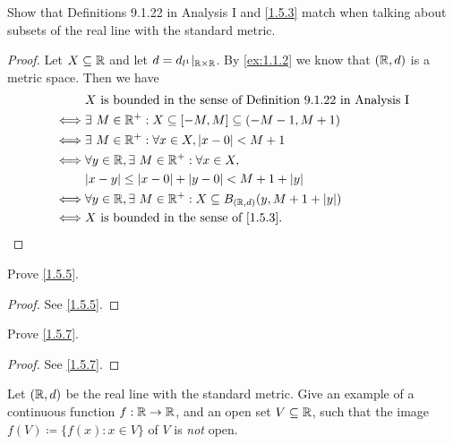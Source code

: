 \begin{ex}\label{ex:1.5.1}
  Show that Definitions 9.1.22 in Analysis I and \cref{1.5.3} match when talking about subsets of the real line with the standard metric.
\end{ex}

\begin{proof}
  Let \(X \subseteq \mathbb{R}\) and let \(d = d_{l^1}|_{\mathbb{R} \times \mathbb{R}}\).
  By \cref{ex:1.1.2} we know that \((\mathbb{R}, d)\) is a metric space.
  Then we have
  \begin{align*}
         & X \text{ is bounded in the sense of Definition 9.1.22 in Analysis I}                \\
    \iff & \exists\ M \in \R^+ : X \subseteq [-M, M] \subseteq (-M - 1, M + 1)                 \\
    \iff & \exists\ M \in \R^+ : \forall x \in X, \abs{x - 0} < M + 1                          \\
    \iff & \forall y \in \R, \exists\ M \in \R^+ : \forall x \in X,                            \\
         & \abs{x - y} \leq \abs{x - 0} + \abs{y - 0} < M + 1 + \abs{y}                        \\
    \iff & \forall y \in \R, \exists\ M \in \R^+ : X \subseteq B_{(\R, d)}(y, M + 1 + \abs{y}) \\
    \iff & X \text{ is bounded in the sense of \cref{1.5.3}}.
  \end{align*}
\end{proof}

\begin{ex}\label{ex:1.5.2}
  Prove \cref{1.5.5}.
\end{ex}

\begin{proof}
  See \cref{1.5.5}.
\end{proof}

\begin{ex}\label{ex:1.5.3}
  Prove \cref{1.5.7}.
\end{ex}

\begin{proof}
  See \cref{1.5.7}.
\end{proof}

\begin{ex}\label{ex:1.5.4}
  Let \((\mathbb{R}, d)\) be the real line with the standard metric.
  Give an example of a continuous function \(f : \mathbb{R} \to \mathbb{R}\), and an open set \(V \subseteq \mathbb{R}\), such that the image \(f(V) \coloneqq \{f(x) : x \in V\}\) of \(V\) is \emph{not} open.
\end{ex}

